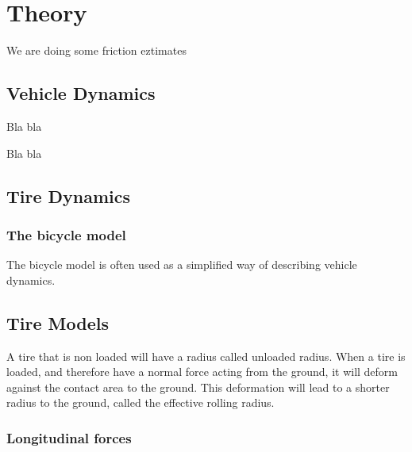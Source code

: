 \chapter{Theory}


We are doing some friction eztimates

\section{Vehicle Dynamics}

Bla bla \cite{fordonsdynamik}

Bla bla \cite{pacejka}


\section{Tire Dynamics}

\subsection{The bicycle model}

The bicycle model is often used as a simplified way of describing vehicle dynamics. 

\section{Tire Models}

A tire that is non loaded will have a radius called unloaded radius. When a tire is loaded, and therefore have a normal force acting from the ground, it will deform against the contact area to the ground. This deformation will lead to a shorter radius to the ground, called the effective rolling radius. 

\subsection{Longitudinal forces}

